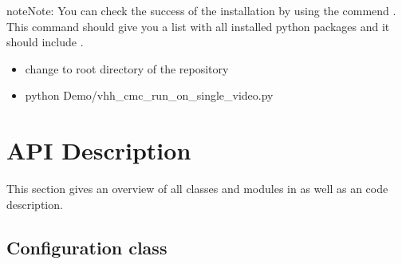\documentclass[letterpaper,10pt,english,openany,oneside]{sphinxmanual}
\begin{document}
\begin{sphinxadmonition}{note}{Note:}
You can check the success of the installation by using the commend . This command should give you a list
with all installed python packages and it should include .
\end{sphinxadmonition}

\begin{itemize}
\item {} 
change to root directory of the repository

\item {} 
python Demo/vhh\_cmc\_run\_on\_single\_video.py

\end{itemize}


\chapter{API Description}
\label{\detokenize{index:api-description}}
This section gives an overview of all classes and modules in  as well as an code description.


\section{Configuration class}
\label{\detokenize{Configuration:configuration-class}}\label{\detokenize{Configuration::doc}}
\end{document}
